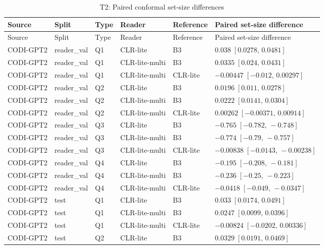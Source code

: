 \begingroup\scriptsize\setlength{\tabcolsep}{3pt}
\begin{longtable}{@{}p{}p{}p{}p{}p{}p{}@{}}
\caption{T2: Paired conformal set-size differences}\label{tab:t2-paired-sizes}\\
\toprule
Source & Split & Type & Reader & Reference & Paired set-size difference \\
\midrule\endfirsthead
\toprule
Source & Split & Type & Reader & Reference & Paired set-size difference \\
\midrule\endhead
CODI-GPT2 & reader\_val & Q1 & CLR-lite & B3 & $0.038\;[0.0278,\,0.0481]$ \\
CODI-GPT2 & reader\_val & Q1 & CLR-lite-multi & B3 & $0.0335\;[0.024,\,0.0431]$ \\
CODI-GPT2 & reader\_val & Q1 & CLR-lite-multi & CLR-lite & $-0.00447\;[-0.012,\,0.00297]$ \\
CODI-GPT2 & reader\_val & Q2 & CLR-lite & B3 & $0.0196\;[0.011,\,0.0278]$ \\
CODI-GPT2 & reader\_val & Q2 & CLR-lite-multi & B3 & $0.0222\;[0.0141,\,0.0304]$ \\
CODI-GPT2 & reader\_val & Q2 & CLR-lite-multi & CLR-lite & $0.00262\;[-0.00371,\,0.00914]$ \\
CODI-GPT2 & reader\_val & Q3 & CLR-lite & B3 & $-0.765\;[-0.782,\,-0.748]$ \\
CODI-GPT2 & reader\_val & Q3 & CLR-lite-multi & B3 & $-0.774\;[-0.79,\,-0.757]$ \\
CODI-GPT2 & reader\_val & Q3 & CLR-lite-multi & CLR-lite & $-0.00838\;[-0.0143,\,-0.00238]$ \\
CODI-GPT2 & reader\_val & Q4 & CLR-lite & B3 & $-0.195\;[-0.208,\,-0.181]$ \\
CODI-GPT2 & reader\_val & Q4 & CLR-lite-multi & B3 & $-0.236\;[-0.25,\,-0.223]$ \\
CODI-GPT2 & reader\_val & Q4 & CLR-lite-multi & CLR-lite & $-0.0418\;[-0.049,\,-0.0347]$ \\
CODI-GPT2 & test & Q1 & CLR-lite & B3 & $0.033\;[0.0174,\,0.0491]$ \\
CODI-GPT2 & test & Q1 & CLR-lite-multi & B3 & $0.0247\;[0.0099,\,0.0396]$ \\
CODI-GPT2 & test & Q1 & CLR-lite-multi & CLR-lite & $-0.00824\;[-0.0202,\,0.00336]$ \\
CODI-GPT2 & test & Q2 & CLR-lite & B3 & $0.0329\;[0.0191,\,0.0469]$ \\

\end{longtable}
